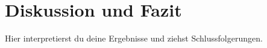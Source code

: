 
\chapter{Diskussion und Fazit}
\label{chap:diskussion}

Hier interpretierst du deine Ergebnisse und ziehst Schlussfolgerungen.